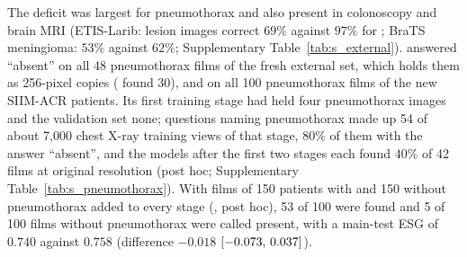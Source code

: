 The deficit was largest for pneumothorax and also present in colonoscopy and brain MRI (ETIS-Larib: lesion images correct $69\%$ against $97\%$ for \gem; BraTS meningioma: $53\%$ against $62\%$; Supplementary Table~\ref{tab:s_external}). \ms{} answered ``absent'' on all 48 pneumothorax films of the fresh external set, which holds them as 256-pixel copies (\gem{} found 30), and on all 100 pneumothorax films of the new SIIM-ACR patients.
Its first training stage had held four pneumothorax images and the validation set none; questions naming pneumothorax made up 54 of about 7{,}000 chest X-ray training views of that stage, $80\%$ of them with the answer ``absent'', and the models after the first two stages each found $40\%$ of 42 films at original resolution (post hoc; Supplementary Table~\ref{tab:s_pneumothorax}).
With films of 150 patients with and 150 without pneumothorax added to every stage (\msp, post hoc), 53 of 100 were found and 5 of 100 films without pneumothorax were called present, with a main-test ESG of $0.740$ against $0.758$ (difference $-0.018$ $[-0.073,\,0.037]$).
